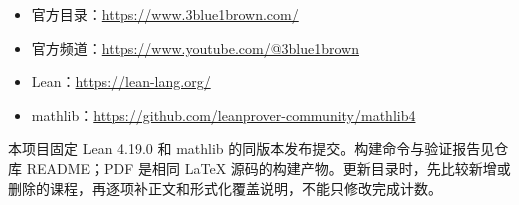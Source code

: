 \documentclass[UTF8,11pt,oneside,fontset=fandol]{ctexbook}
\begin{document}
\begin{itemize}
\item 官方目录：\url{https://www.3blue1brown.com/}
\item 官方频道：\url{https://www.youtube.com/@3blue1brown}
\item Lean：\url{https://lean-lang.org/}
\item mathlib：\url{https://github.com/leanprover-community/mathlib4}
\end{itemize}
本项目固定 Lean 4.19.0 和 mathlib 的同版本发布提交。构建命令与验证报告见仓库 README；PDF 是相同 LaTeX 源码的构建产物。更新目录时，先比较新增或删除的课程，再逐项补正文和形式化覆盖说明，不能只修改完成计数。
\end{document}
